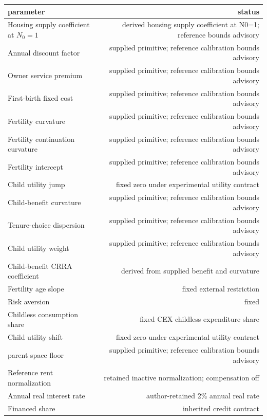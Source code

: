 \begin{tabular}{lr}
\toprule
parameter & status \\
\midrule
Housing supply coefficient at $N_0=1$ & derived housing supply coefficient at N0=1; reference bounds advisory \\
Annual discount factor & supplied primitive; reference calibration bounds advisory \\
Owner service premium & supplied primitive; reference calibration bounds advisory \\
First-birth fixed cost & supplied primitive; reference calibration bounds advisory \\
Fertility curvature & supplied primitive; reference calibration bounds advisory \\
Fertility continuation curvature & supplied primitive; reference calibration bounds advisory \\
Fertility intercept & supplied primitive; reference calibration bounds advisory \\
Child utility jump & fixed zero under experimental utility contract \\
Child-benefit curvature & supplied primitive; reference calibration bounds advisory \\
Tenure-choice dispersion & supplied primitive; reference calibration bounds advisory \\
Child utility weight & supplied primitive; reference calibration bounds advisory \\
Child-benefit CRRA coefficient & derived from supplied benefit and curvature \\
Fertility age slope & fixed external restriction \\
Risk aversion & fixed \\
Childless consumption share & fixed CEX childless expenditure share \\
Child utility shift & fixed zero under experimental utility contract \\
parent space floor & supplied primitive; reference calibration bounds advisory \\
Reference rent normalization & retained inactive normalization; compensation off \\
Annual real interest rate & author-retained 2\% annual real rate \\
Financed share & inherited credit contract \\

\end{tabular}
